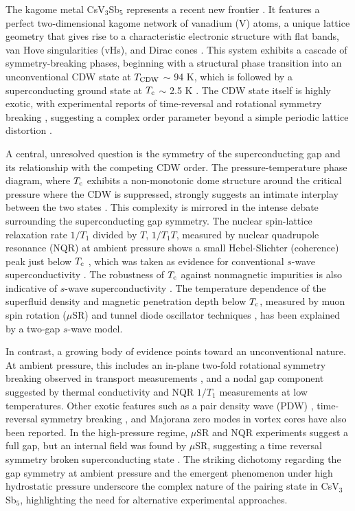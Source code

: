 \documentclass[aps,prl,twocolumn,superscriptaddress]{revtex4-2}
\begin{document}
The kagome metal CsV$_3$Sb$_5$ represents a recent new frontier \cite{Ortiz,OrtizReview}. It features a perfect two-dimensional kagome network of vanadium (V) atoms, a unique lattice geometry that gives rise to a characteristic electronic structure with flat bands, van Hove singularities (vHs), and Dirac cones \cite{OrtizReview}. This system exhibits a cascade of symmetry-breaking phases, beginning with a structural phase transition into an unconventional CDW state at $T_{\rm CDW}$ $\sim$ 94 K, which is followed by a superconducting ground state at $T_{\rm c}$ $\sim$ 2.5 K \cite{Ortiz,OrtizReview}. The CDW state itself is highly exotic, with experimental reports of time-reversal and rotational symmetry breaking \cite{ZWangSTM,OrtizPRX,ZShan_muSR,LuoNPJ}, suggesting a complex order parameter beyond a simple periodic lattice distortion \cite{TazaiPNAS}.

A central, unresolved question is the symmetry of the superconducting gap and its relationship with the competing CDW order. The pressure-temperature phase diagram, where $T_{\rm c}$ exhibits a non-monotonic dome structure around the critical pressure where the CDW is suppressed, strongly suggests an intimate interplay between the two states \cite{Chen_PRL,WuNature,FengNPJ,FengNatCom}. This complexity is mirrored in the intense debate surrounding the superconducting gap symmetry. The nuclear spin-lattice relaxation rate $1/T_1$ divided by $T$, $1/T_1T$, measured by nuclear quadrupole resonance (NQR) at ambient pressure shows a small Hebel-Slichter (coherence) peak just below $T_{\rm c}$ \cite{ZLi,WuNature,FengNatCom,Kitagawa}, which was taken as evidence for conventional $s$-wave superconductivity \cite{ZLi,Kitagawa}.  The robustness of $T_{\rm c}$ against nonmagnetic impurities is also indicative of $s$-wave superconductivity \cite{Roppongi}. The temperature dependence of the superfluid density and magnetic penetration depth below $T_{\rm c}$, measured by muon spin rotation ($\mu$SR) \cite{ZShan_muSR,GuptamuSR} and tunnel diode oscillator techniques \cite{Yuan, Roppongi}, has been explained by a two-gap $s$-wave model.


 In contrast, a growing body of evidence points toward an unconventional nature. At ambient pressure, this includes an in-plane two-fold rotational symmetry breaking observed in transport measurements \cite{Ni_CPL,XiangNatCom}, and a nodal gap component suggested by thermal conductivity \cite{HossainNatPhys} and NQR $1/T_1$ measurements \cite{FengNatCom} at low temperatures. Other exotic features such as a pair density wave (PDW) \cite{Chen_PDW,DengNature}, time-reversal symmetry breaking \cite{DengNature,LeNature}, and Majorana zero modes in vortex cores \cite{LiangPRX} have also been reported. In the high-pressure regime, $\mu$SR \cite{Guguchia_muSR} and NQR \cite{FengNatCom} experiments suggest a full gap, but an internal field was found by $\mu$SR, suggesting a time reversal symmetry broken superconducting state \cite{Guguchia_muSR}. The striking dichotomy regarding the gap symmetry at ambient pressure and the emergent phenomenon under high hydrostatic pressure underscore the complex nature of the pairing state in CsV$_3$Sb$_5$, highlighting the need for alternative experimental approaches.
\end{document}
